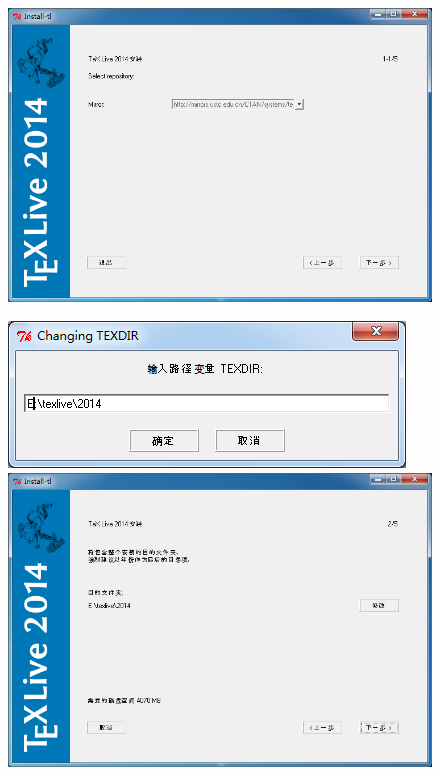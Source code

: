 \documentclass[xcolor=table,dvipsnames,svgnames]{beamer}
\begin{document}
\begin{frame}
  \begin{figure}[h]
  \centering
\includegraphics[scale=0.5]{simple2-ustc.png}
  \end{figure}
\end{frame}

\begin{frame}
  \begin{figure}[h]
  \centering
  \includegraphics[height=.25\textheight]{simple3-dir.png}\\
  \includegraphics[scale=0.4]{simple4.png}
  \end{figure}
\end{frame}
\end{document}
